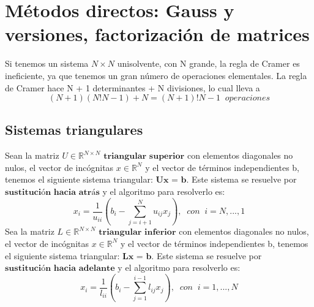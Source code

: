 	\section{Métodos directos: Gauss y versiones, factorización de matrices}
	Si tenemos un sistema $N \times N$ unisolvente, con N grande, la regla de Cramer es ineficiente, ya que tenemos un gran número de operaciones elementales. La regla de Cramer hace N + 1 determinantes + N divisiones, lo cual lleva a
\[ (N+1)(N!N-1)+N = (N+1)!N-1 \; \; operaciones \]
		\subsection{Sistemas triangulares}
		Sean la matriz $U \in \mathbb{R}^{N \times N}$ $\textbf{triangular superior}$ con elementos diagonales no nulos, el vector de incógnitas $x \in \mathbb{R}^N$ y el vector de términos independientes b, tenemos el siguiente sistema triangular: $\textbf{Ux = b}$. Este sistema se resuelve por $\textbf{sustitución hacia atrás}$ y el algoritmo para resolverlo es:
		\[ x_i = \frac{1}{u_{ii}} \left( b_i - \sum _{j=i+1}^N u_{ij}x_j \right), \; \; con \; \; i = N,...,1 \]
		Sea la matriz $L \in \mathbb{R}^{N \times N}$  $\textbf{triangular inferior}$ con elementos diagonales no nulos, el vector de incógnitas $x \in \mathbb{R}^N$ y el vector de términos independientes b, tenemos el siguiente sistema triangular: $\textbf{Lx = b}$. Este sistema se resuelve por $\textbf{sustitución hacia adelante}$ y el algoritmo para resolverlo es:
		\[ x_i = \frac{1}{l_{ii}} \left( b_i - \sum _{j=1}^{i-1} l_{ij}x_j \right), \; \; con \; \; i = 1,...,N \]
		
